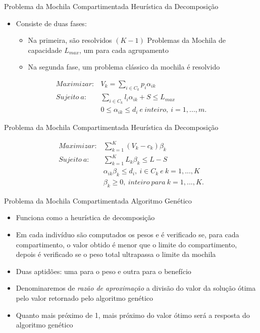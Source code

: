 \documentclass[slidestop,compress,mathserif]{beamer}
\begin{document}
\begin{frame} {Problema da Mochila Compartimentada} {Heurística da Decomposição}

\begin{itemize}
 \item Consiste de duas fases:
\begin{itemize}
\item Na primeira, são resolvidos $(K-1)$ Problemas da Mochila de capacidade $L_{max}$, um para cada agrupamento
\item Na segunda fase, um problema clássico da mochila é resolvido
\end{itemize}
\end{itemize}

\begin{eqnarray}
	Maximizar: & \displaystyle V_{k} = \sum_{i \in C_{k}}p_{i}\alpha_{ik} \\
	Sujeito \ a: & \displaystyle \sum_{i \in C_{k}}l_{i}\alpha_{ik} + S \leq L_{max} \\
	& \displaystyle 0 \leq \alpha_{ik} \leq d_{i} \ e \ inteiro, \ i = 1, ..., m. \nonumber
\end{eqnarray}

\end{frame}


\begin{frame} {Problema da Mochila Compartimentada} {Heurística da Decomposição}

\begin{eqnarray}
	Maximizar: & \displaystyle \sum_{k = 1}^{K}(V_{k} - c_{k})\beta_{k} \\
	Sujeito \ a: & \displaystyle \sum_{k = 1}^{K}L_{k}\beta_{k} \leq L - S \\
	& \displaystyle \alpha_{ik}\beta_{k} \leq d_{i}, \ i \in C_{k} \ e \ k = 1, ..., K \nonumber \\
	& \beta_{k} \geq 0, \ inteiro \ para \ k  = 1, ..., K. \nonumber
\end{eqnarray}

\end{frame}


\begin{frame} {Problema da Mochila Compartimentada} {Algoritmo Genético}

\begin{itemize}
 
 \item Funciona como a heurística de decomposição
 \item Em cada indivíduo são computados os pesos e é verificado se, para cada compartimento, o valor obtido é menor que o limite do compartimento, depois é verificado se o peso total ultrapassa o limite da mochila
 \item Duas aptidões: uma para o peso e outra para o benefício
 \item Denominaremos de {\it razão de aproximação} a divisão do valor da solução ótima pelo valor retornado pelo algoritmo genético
 \item Quanto mais próximo de 1, mais próximo do valor ótimo será a resposta do algoritmo genético
\end{itemize}

\end{frame}
\end{document}

